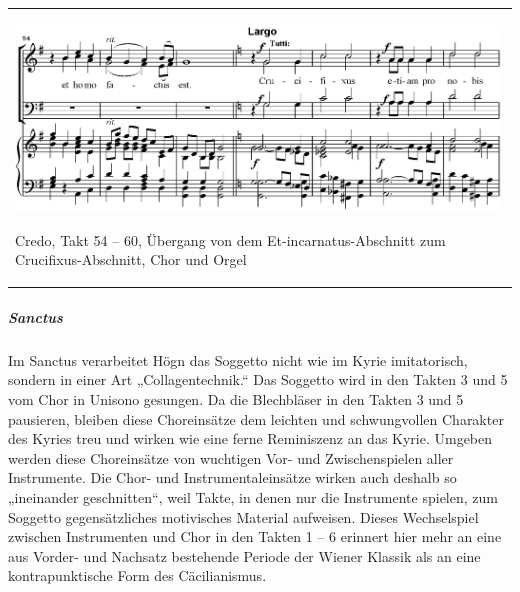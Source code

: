 \begin{center}
\tablefirsthead{}
\tablehead{}
\tabletail{}
\tablelasttail{}
\begin{supertabular}{m{13.070001cm}}

\includegraphics[width=12.887cm,height=4.953cm]{pictures/zulassungsarbeit-img120.png}

Credo, Takt 54 – 60, Übergang von dem
Et-incarnatus-Abschnitt zum Crucifixus-Abschnitt, Chor und Orgel

\\
\end{supertabular}
\end{center}
\subparagraph{Sanctus}
Im Sanctus verarbeitet Högn das Soggetto nicht wie im Kyrie
imitatorisch, sondern in einer Art „Collagentechnik.“ Das Soggetto wird
in den Takten 3 und 5 vom Chor in Unisono gesungen. Da die Blechbläser
in den Takten 3 und 5 pausieren, bleiben diese Choreinsätze dem
leichten und schwungvollen Charakter des Kyries treu und wirken wie
eine ferne Reminiszenz an das Kyrie. Umgeben werden diese Choreinsätze
von wuchtigen Vor- und Zwischenspielen aller Instrumente. Die Chor- und
Instrumentaleinsätze wirken auch deshalb so „ineinander geschnitten“,
weil Takte, in denen nur die Instrumente spielen, zum Soggetto
gegensätzliches motivisches Material aufweisen. Dieses Wechselspiel
zwischen Instrumenten und Chor in den Takten 1 – 6 erinnert hier mehr
an eine aus Vorder- und Nachsatz bestehende Periode der Wiener Klassik
als an eine kontrapunktische Form des Cäcilianismus.

